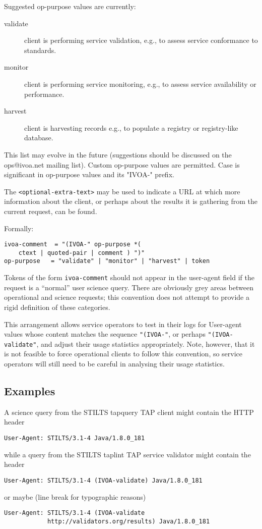 \documentclass[11pt,a4paper]{ivoa}
\begin{document}
Suggested op-purpose values are currently:

\begin{description}
\item[validate]
client is performing service validation, e.g., to assess service
conformance to standards.
\item[monitor] client is performing service monitoring, e.g.,
to assess service availability or performance.
\item[harvest] client is harvesting records e.g., to populate 
a registry or registry-like database.
\end{description}

This list may evolve in the future (suggestions should be discussed on
the ops@ivoa.net mailing list). Custom op-purpose values are permitted.
Case is significant in op-purpose values and its "IVOA-" prefix.

The \verb|<optional-extra-text>| may  be used to indicate a URL at which
more information about the client, or perhaps about the results it is
gathering from the current request, can be found.

Formally:

\begin{lstlisting}
ivoa-comment  = "(IVOA-" op-purpose *( 
    ctext | quoted-pair | comment ) ")"
op-purpose   = "validate" | "monitor" | "harvest" | token
\end{lstlisting}

Tokens of the form \verb|ivoa-comment| should not appear in the
user-agent field if the request is a ``normal'' user science query. There
are obviously grey areas between operational and science requests; this
convention does not attempt to provide a rigid definition of these
categories.

This arrangement allows service operators to test in their logs for
User-agent values whose content matches the sequence \verb|"(IVOA-"|, or
perhaps \verb|"(IVOA-validate"|, and adjust their usage statistics
appropriately. Note, however, that it is not feasible to force operational
clients to follow this convention, so service operators will still need
to be careful in analysing their usage statistics.

\subsection{Examples}

A science query from the STILTS tapquery TAP client might contain the
HTTP header
\begin{lstlisting}
User-Agent: STILTS/3.1-4 Java/1.8.0_181
\end{lstlisting}
while a query from the STILTS taplint TAP service validator might
contain the header
\begin{lstlisting}
User-Agent: STILTS/3.1-4 (IVOA-validate) Java/1.8.0_181
\end{lstlisting}
or maybe (line break for typographic reasons)
\begin{lstlisting}
User-Agent: STILTS/3.1-4 (IVOA-validate
            http://validators.org/results) Java/1.8.0_181
\end{lstlisting}
\end{document}
